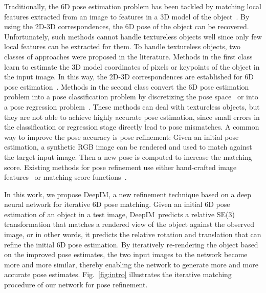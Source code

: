 \documentclass[twocolumn]{svjour3}
\newcommand{\dimnet}[0]{DeepIM}
\newcommand{\yi}[1]{#1}
\begin{document}
Traditionally, the 6D pose estimation problem has been tackled by matching local features extracted from an image to features in a 3D model of the object~\citep{lowe1999object,rothganger20063d,collet2011moped}. By using the 2D-3D correspondences, the 6D pose of the object can be recovered. Unfortunately, such methods cannot handle textureless objects well since only few local features can be extracted for them. To handle textureless objects, two classes of approaches were proposed in the literature. Methods in the first class learn to estimate the 3D model coordinates of pixels or keypoints of the object in the input image. In this way, the 2D-3D correspondences are established for 6D pose estimation~\citep{Brachmann2014Learning6O,rad2017bb8,tekin2017real}. Methods in the second class convert the 6D pose estimation problem into a pose classification problem by discretizing the pose space~\citep{hinterstoisser2012accv} or into a pose regression problem~\citep{xiang2017posecnn}. These methods can deal with textureless objects, but they are not able to achieve highly accurate pose estimation, since small errors in the classification or regression stage directly lead to pose mismatches. A common way to improve the pose accuracy is pose refinement: Given an initial pose estimation, a synthetic RGB image can be rendered and used to match against the target input image. Then a new pose is computed to increase the matching score. Existing methods for pose refinement use either hand-crafted image features~\citep{tjaden2017real} or matching score functions~\citep{rad2017bb8}. 

In this work, we propose \dimnet, a new refinement technique based on a deep neural network for iterative 6D pose matching. Given an initial 6D pose estimation of an object in a test image, \dimnet\ predicts a relative SE(3) transformation that matches a rendered view of the object against the observed image\yi{, or in other words, it predicts the relative rotation and translation that can refine the initial 6D pose estimation.}  By iteratively re-rendering the object based on the improved pose estimates, the two input images to the network become more and more similar, thereby enabling the network to generate more and more accurate pose estimates. Fig.~\ref{fig:intro} illustrates the iterative matching procedure of our network for pose refinement.
\end{document}
